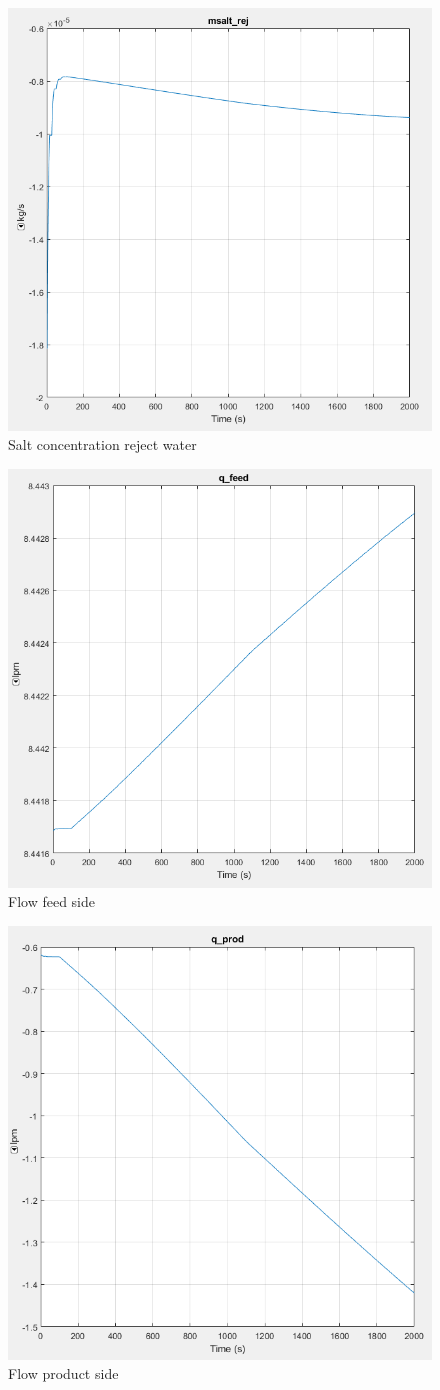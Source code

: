 \begin{figure}[h]
  \centering
  \includegraphics[width=0.5\linewidth]{msalt_rej.PNG}
  \caption{Salt concentration reject water}
  \label{fig:msaltr}
\end{figure}
\begin{figure}[h]
  \centering
  \includegraphics[width=0.5\linewidth]{q_feed.PNG}
  \caption{Flow feed side}
  \label{fig:qf}
\end{figure}
\begin{figure}[h]
  \centering
  \includegraphics[width=0.5\linewidth]{q_prod.PNG}
  \caption{Flow product side}
  \label{fig:qp}
\end{figure}
